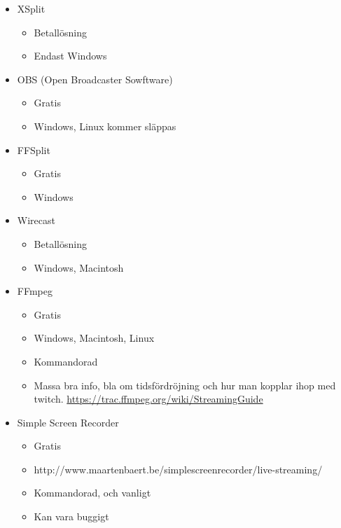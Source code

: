 \documentclass[a4paper,11pt]{article}
\begin{document}
  \begin{itemize}
    \item XSplit
      \begin{itemize}
        \item Betallösning
        \item Endast Windows
      \end{itemize}

    \item OBS (Open Broadcaster Sowftware)
      \begin{itemize}
        \item Gratis
        \item Windows, Linux kommer släppas
      \end{itemize}

    \item FFSplit
      \begin{itemize}
        \item Gratis
        \item Windows
      \end{itemize}

    \item Wirecast
      \begin{itemize}
        \item Betallösning
        \item Windows, Macintosh
      \end{itemize}

    \item FFmpeg
      \begin{itemize}
        \item Gratis
        \item Windows, Macintosh, Linux
        \item Kommandorad
        \item Massa bra info, bla om tidsfördröjning och hur man kopplar ihop
              med twitch.  \url{https://trac.ffmpeg.org/wiki/StreamingGuide}
      \end{itemize}

    \item Simple Screen Recorder
      \begin{itemize}
        \item Gratis
        \item http://www.maartenbaert.be/simplescreenrecorder/live-streaming/
        \item Kommandorad, och vanligt
        \item Kan vara buggigt
      \end{itemize}
  \end{itemize}
\end{document}
